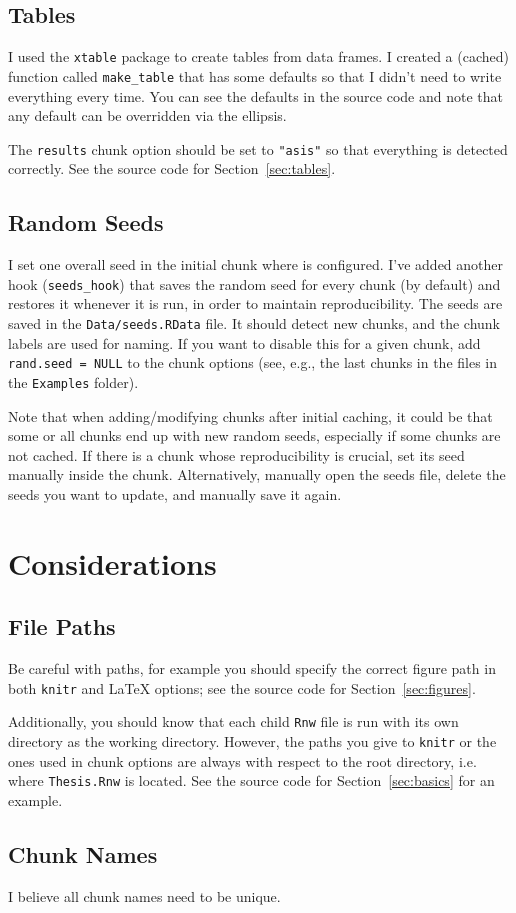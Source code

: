 \subsection{Tables}

I used the \texttt{xtable} package to create tables from data frames. I created a (cached) function called \texttt{make\_table} that has some defaults so that I didn't need to write everything every time. You can see the defaults in the source code and note that any default can be overridden via the ellipsis.

The \texttt{results} chunk option should be set to \texttt{"asis"} so that everything is detected correctly. See the source code for Section~\ref{sec:tables}.

\subsection{Random Seeds}

I set one overall seed in the initial chunk where  is configured. I've added another hook (\texttt{seeds\_hook}) that saves the random seed for every chunk (by default) and restores it whenever it is run, in order to maintain reproducibility. The seeds are saved in the \texttt{Data/seeds.RData} file. It should detect new chunks, and the chunk labels are used for naming. If you want to disable this for a given chunk, add \texttt{rand.seed = NULL} to the chunk options (see, e.g., the last chunks in the files in the \texttt{Examples} folder).

Note that when adding/modifying chunks after initial caching, it could be that some or all chunks end up with new random seeds, especially if some chunks are not cached. If there is a chunk whose reproducibility is crucial, set its seed manually inside the chunk. Alternatively, manually open the seeds file, delete the seeds you want to update, and manually save it again.

\section{Considerations}
\label{sec:considerations}

\subsection{File Paths}

Be careful with paths, for example you should specify the correct figure path in both \texttt{knitr} and \LaTeX{} options; see the source code for Section~\ref{sec:figures}.

Additionally, you should know that each child \texttt{Rnw} file is run with its own directory as the working directory. However, the paths you give to \texttt{knitr} or the ones used in chunk options are always with respect to the root directory, i.e. where \texttt{Thesis.Rnw} is located. See the source code for Section~\ref{sec:basics} for an example.

\subsection{Chunk Names}

I believe all chunk names need to be unique.
